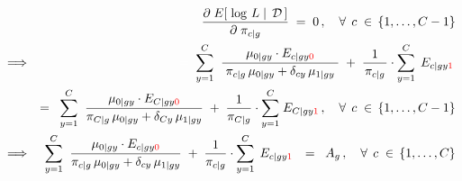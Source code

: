 \begin{eqnarray*}
&&
	\dfrac{\partial\;E\!\left[\,\left.\log\,L\;\right\vert\;\mathcal{D}\,\right]}{\partial\;\pi_{c \vert g}} \;=\; 0\,,
	\quad\forall\;\,c\;\in\,\{1,\ldots,C-1\}
\\
&\Longrightarrow&
	\;{\color{white}=} \;\;
		\overset{C}{\underset{y=1}{\sum}}\;\;
		\dfrac{\mu_{0 \vert gy} \cdot E_{c \vert gy{\color{red}0}}}{
			{\color{white}.}
			\pi_{c \vert g}\,\mu_{0 \vert gy} + \delta_{cy}\,\mu_{1\vert gy}
			{\color{white}.}
			}
		\; + \;
		\dfrac{1}{
			{\color{white}\vert}\!
			\pi_{c \vert g}
			\!{\color{white}\vert}
			}
		\cdot
			\overset{C}{\underset{y=1}{\sum}}\;
			\,E_{c \vert gy{\color{red}1}}\,
\\
&&
	= \;\;
		\overset{C}{\underset{y=1}{\sum}}\;\;
		\dfrac{\mu_{0 \vert gy} \cdot E_{C \vert gy{\color{red}0}}}{\pi_{C \vert g}\,\mu_{0 \vert gy} + \delta_{Cy}\,\mu_{1\vert gy}}
		\; + \;
		\dfrac{1}{\pi_{C \vert g}}
		\cdot
			\overset{C}{\underset{y=1}{\sum}}\;
			E_{C \vert gy{\color{red}1}}\,,
		\quad\forall\;\,c\;\in\,\{1,\ldots,C-1\}
\\
&\Longrightarrow&
		\overset{C}{\underset{y=1}{\sum}}\;\;
		\dfrac{\mu_{0 \vert gy} \cdot E_{c \vert gy{\color{red}0}}}{
			\pi_{c \vert g}\,\mu_{0 \vert gy} + \delta_{cy}\,\mu_{1\vert gy}
			}
		\; + \;
		\dfrac{1}{\pi_{c \vert g}}
		\cdot
			\overset{C}{\underset{y=1}{\sum}}\;
			\,E_{c \vert gy{\color{red}1}}\,
		\;\; = \;\;
		A_{g}\,,
		\quad\forall\;\,c\;\in\,\{1,\ldots,C\}
\end{eqnarray*}

